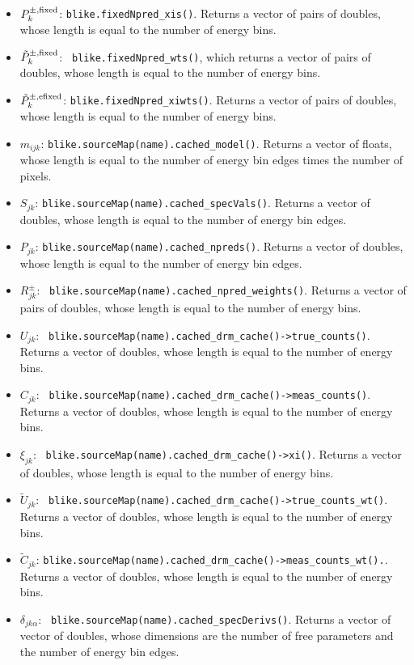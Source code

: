 \documentclass[preprint]{aastex}
\begin{document}
\begin{itemize}
{    bin edges.}
\item{ {\bf $P_{k}^{\pm, \rm fixed}$}: {\tt blike.fixedNpred\_xis()}.
    Returns a vector of pairs of doubles, whose length is equal to the
    number of energy bins.}
\item{ {\bf $\tilde{P}_{k}^{\pm, \rm fixed}$}: {\tt
      blike.fixedNpred\_wts()}, which returns a vector of pairs of
    doubles, whose length is equal to the number of energy bins.}
\item{ {\bf $\tilde{P}_{k}^{\pm, \rm efixed}$}:
    {\tt blike.fixedNpred\_xiwts()}.  Returns a vector of pairs of
    doubles, whose length is equal to the number of energy bins.}
\item{ {\bf $m_{ijk}$}: {\tt blike.sourceMap(name).cached\_model()}.
    Returns a vector of floats, whose length is equal to the
    number of energy bin edges times the number of pixels.}
\item{ {\bf $S_{jk}$}: {\tt blike.sourceMap(name).cached\_specVals()}.
    Returns a vector of doubles, whose length is equal to the
    number of energy bin edges.}
\item{ {\bf $P_{jk}$}: {\tt blike.sourceMap(name).cached\_npreds()}.
    Returns a vector of doubles, whose length is equal to the
    number of energy bin edges.}
\item{ {\bf $R_{jk}^{\pm}$}: {\tt
      blike.sourceMap(name).cached\_npred\_weights()}.  Returns a
    vector of pairs of doubles, whose length is equal to the number of
    energy bins.}
\item{ {\bf $U_{jk}$}: {\tt
      blike.sourceMap(name).cached\_drm\_cache()->true\_counts()}.
    Returns a vector of doubles, whose length is equal to the
    number of energy bins.}
\item{ {\bf $C_{jk}$}: {\tt
      blike.sourceMap(name).cached\_drm\_cache()->meas\_counts()}.
    Returns a vector of doubles, whose length is equal to the
    number of energy bins.}
\item{ {\bf $\xi_{jk}$}: {\tt
      blike.sourceMap(name).cached\_drm\_cache()->xi()}.  Returns
    a vector of doubles, whose length is equal to the number of energy
    bins.}
\item{ {\bf $\tilde{U}_{jk}$}: {\tt
      blike.sourceMap(name).cached\_drm\_cache()->true\_counts\_wt()}.
    Returns a vector of doubles, whose length is equal to the number
    of energy bins.}
\item{ {\bf $\tilde{C}_{jk}$}:
    {\tt blike.sourceMap(name).cached\_drm\_cache()->meas\_counts\_wt().}.
    Returns a vector of doubles, whose length is equal to the
    number of energy bins.}
\item{ {\bf $\delta_{jk\alpha}$}: {\tt
      blike.sourceMap(name).cached\_specDerivs()}.  Returns a
    vector of vector of doubles, whose dimensions are the number of
    free parameters and the number of energy bin edges.}
\end{itemize}
\end{document}

